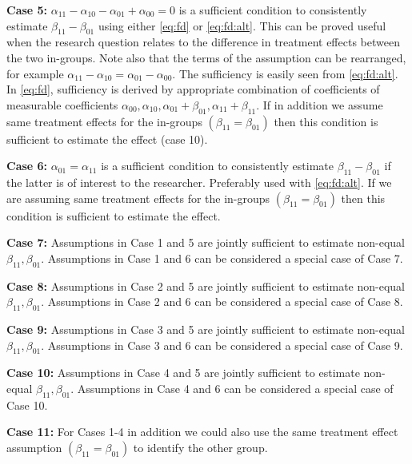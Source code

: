 \documentclass[12pt]{article}
\begin{document}
\textbf{Case 5:} $\alpha_{11}-\alpha_{10}-\alpha_{01} +\alpha_{00}=0$ is a sufficient condition to consistently estimate $\beta_{11}-\beta_{01}$ using either \ref{eq:fd} or \ref{eq:fd:alt}. This can be proved useful when the research question relates to the difference in treatment effects between the two in-groups. Note also that the terms of the assumption can be rearranged, for example $\alpha_{11}-\alpha_{10}=\alpha_{01} -\alpha_{00}$. The sufficiency is easily seen from \ref{eq:fd:alt}. In \ref{eq:fd}, sufficiency is derived by appropriate combination of coefficients of measurable coefficients $\alpha_{00},\alpha_{10},\alpha_{01}+\beta_{01},\alpha_{11}+\beta_{11}$. If in addition we assume same treatment effects for the in-groups  $(\beta_{11}=\beta_{01})$ then this condition is sufficient to estimate the effect (case 10). 

\textbf{Case 6:} $\alpha_{01} = \alpha_{11}$ is a sufficient condition to consistently estimate $\beta_{11}-\beta_{01}$ if the latter is of interest to the researcher. Preferably used with \ref{eq:fd:alt}. If we are assuming same treatment effects for the in-groups  $(\beta_{11}=\beta_{01})$ then this condition is sufficient to estimate the effect.

\textbf{Case 7:} Assumptions in Case 1 and 5 are jointly sufficient to estimate non-equal $\beta_{11},\beta_{01}$. Assumptions in Case 1 and 6 can be considered a special case of Case 7.

\textbf{Case 8:} Assumptions in Case 2 and 5 are jointly sufficient to estimate non-equal $\beta_{11},\beta_{01}$. Assumptions in Case 2 and 6 can be considered a special case of Case 8.

\textbf{Case 9:} Assumptions in Case 3 and 5 are jointly sufficient to estimate non-equal $\beta_{11},\beta_{01}$. Assumptions in Case 3 and 6 can be considered a special case of Case 9.

\textbf{Case 10:} Assumptions in Case 4 and 5 are jointly sufficient to estimate non-equal $\beta_{11},\beta_{01}$. Assumptions in Case 4 and 6 can be considered a special case of Case 10.

\textbf{Case 11:} For Cases 1-4 in addition we could also use the same treatment effect assumption $(\beta_{11}=\beta_{01})$ to identify the other group.
\end{document}
